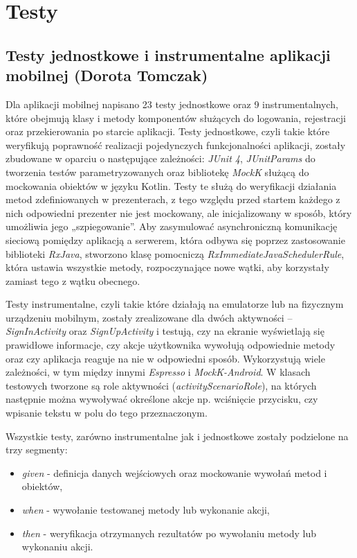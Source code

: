 \documentclass[10pt,twoside,a4paper]{report}
\begin{document}
\chapter{Testy}

\section{Testy jednostkowe i instrumentalne aplikacji mobilnej (Dorota Tomczak)}
\par Dla aplikacji mobilnej napisano 23 testy jednostkowe oraz 9 instrumentalnych, które obejmują klasy i metody komponentów służących do logowania, rejestracji oraz przekierowania po starcie aplikacji. Testy jednostkowe, czyli takie które weryfikują poprawność realizacji pojedynczych funkcjonalności aplikacji, zostały zbudowane w oparciu o następujące zależności: \textit{JUnit 4}\cite{JUnit}, \textit{JUnitParams}\cite{JUnitParms} do tworzenia testów parametryzowanych oraz bibliotekę \textit{MockK}\cite{MockK} służącą do mockowania obiektów w języku Kotlin. Testy te służą do weryfikacji działania metod zdefiniowanych w prezenterach, z tego względu przed startem każdego z nich odpowiedni prezenter nie jest mockowany, ale inicjalizowany w sposób, który umożliwia jego „szpiegowanie”. Aby zasymulować asynchroniczną komunikację sieciową pomiędzy aplikacją a serwerem, która odbywa się poprzez zastosowanie biblioteki \textit{RxJava}\cite{RxJava}, stworzono klasę pomocniczą \textit{RxImmediateJavaSchedulerRule}, która ustawia wszystkie metody, rozpoczynające nowe wątki, aby korzystały zamiast tego z wątku obecnego.
\par Testy instrumentalne, czyli takie które działają na emulatorze lub na fizycznym urządzeniu mobilnym, zostały zrealizowane dla dwóch aktywności – \textit{SignInActivity} oraz \textit{SignUpActivity} i testują, czy na ekranie wyświetlają się prawidłowe informacje, czy akcje użytkownika wywołują odpowiednie metody oraz czy aplikacja reaguje na nie w odpowiedni sposób. Wykorzystują wiele zależności, w tym między innymi \textit{Espresso}\cite{Espresso} i \textit{MockK-Android}\cite{MockK-Android}. W klasach testowych tworzone są role aktywności (\textit{activityScenarioRole}), na których następnie można wywoływać określone akcje np. wciśnięcie przycisku, czy wpisanie tekstu w polu do tego przeznaczonym. 
\par Wszystkie testy, zarówno instrumentalne jak i jednostkowe zostały podzielone na trzy segmenty:
\begin{itemize}
\item \textit{given} -  definicja danych wejściowych oraz mockowanie wywołań metod i obiektów,
\item \textit{when} - wywołanie testowanej metody lub wykonanie akcji,
\item \textit{then} - weryfikacja otrzymanych rezultatów po wywołaniu metody lub wykonaniu akcji.
\end{itemize}
\end{document}
